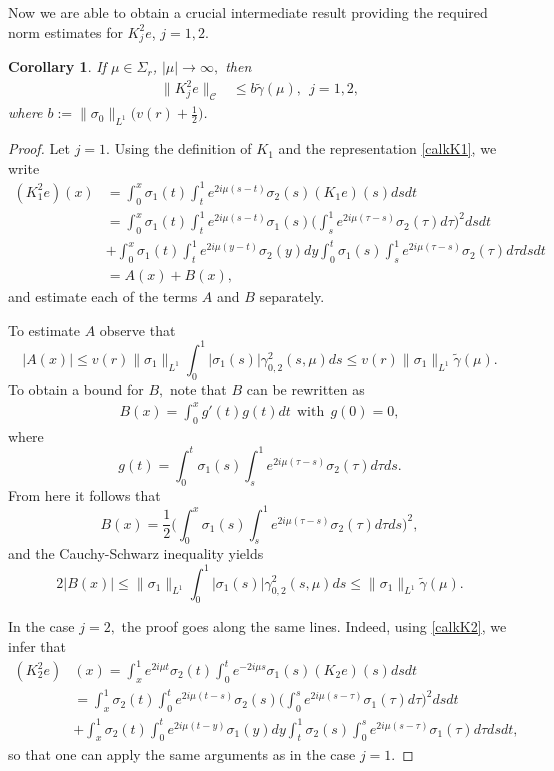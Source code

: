 \documentclass[11pt]{amsart}
\theoremstyle{plain}
\newtheorem{cor}[thm]{Corollary}
\theoremstyle{definition}
\theoremstyle{remark}
\numberwithin{equation}{section}
\begin{document}
Now we are able to obtain a crucial intermediate result providing
the required norm estimates for $K_j^2e$,
$j=1,2$.
\begin{cor}\label{corKsq}
If $\mu \in \Sigma_r$, $|\mu|\to \infty,$ then
\begin{align*}
  \|K_j^2e \|_\mathcal{C} & \leq   b \widetilde{\gamma}(\mu), \ \ j=1,2,
\end{align*}
where $b:=\| \sigma_0\|_{L^1}\Big(v(r)+\frac{1}{2}\Big)$.
\end{cor}
\begin{proof}
Let $j=1$. Using the definition of $K_1$ and  the representation \eqref{calkK1}, we write
\begin{align*}
  (K_1^2e)(x) & = \int_0^x \sigma_1(t) \int_t^1 e^{2i \mu (s-t) }\sigma_2(s)(K_1e)(s)dsdt\\
  &= \int_0^x \sigma_1(t)\int_t^1 e^{2i \mu (s-t) }\sigma_1(s)\Big(\int_s^1e^{2i \mu (\tau-s) } \sigma_2(\tau)d\tau\Big)^2 ds dt\\
  &+\int_0^x \sigma_1(t)\int_t^1 e^{2i \mu(y-t) }\sigma_2(y)dy\int_0^t \sigma_1(s)\int_s^1 e^{2i \mu(\tau-s )}\sigma_2(\tau)d\tau dsdt\\
  &=A(x)+B(x),
\end{align*}
and estimate each of the terms $A$ and $B$ separately.

To estimate $A$ observe that
\[|A(x)|\leq v(r)\|\sigma_1\|_{L^1}\int_0^1|\sigma_1(s)|\gamma_{0,2}^2(s,\mu)ds\leq v(r)\|\sigma_1\|_{L^1}\widetilde{\gamma}(\mu).\]
To obtain a bound for $B,$  note that $B$ can be rewritten as
\begin{align*}
B(x)=\int_0^x g'(t)g(t)dt \ \ \mbox{with} \ \ g(0)=0,
\end{align*}
where
\[g(t)=\int_0^t \sigma_1(s)\int_s^1 e^{2i \mu(\tau-s )}\sigma_2(\tau)d\tau ds.\]
From here it follows that
\[B(x)=\frac{1}{2}\Big(\int_0^x \sigma_1(s)\int_s^1 e^{2i \mu(\tau-s )}\sigma_2(\tau)d\tau ds\Big)^2,\]
and the Cauchy-Schwarz inequality yields
\[2|B(x)|\leq \|\sigma_1\|_{L^1}\int_0^1|\sigma_1(s)|\gamma_{0,2}^2(s,\mu)ds\leq \|\sigma_1\|_{L^1} \widetilde{\gamma}(\mu).\]

In the case $j=2,$ the proof goes along the same lines. Indeed, using \eqref{calkK2}, we infer that
\begin{align*}
  (K_2^2e)&(x)  = \int_x^1 e^{2i\mu t}\sigma_2(t)  \int_0^t e^{-2i\mu s }\sigma_1(s)(K_2e)(s)dsdt\\
   &= \int_x^1 \sigma_2(t)\int_0^t e^{2i \mu (t-s) }\sigma_2(s)\Big(\int_0^se^{2i \mu (s-\tau) } \sigma_1(\tau)d\tau\Big)^2 ds dt\\
  &+\int_x^1 \sigma_2(t)\int_0^t  e^{2i \mu(t-y)}\sigma_1(y)dy\int_t^1 \sigma_2(s)\int_0^s  e^{2i \mu(s-\tau )}\sigma_1(\tau)d\tau dsdt,
\end{align*}
so that one can apply the same arguments as in the case $j=1$.
\end{proof}
\end{document}
